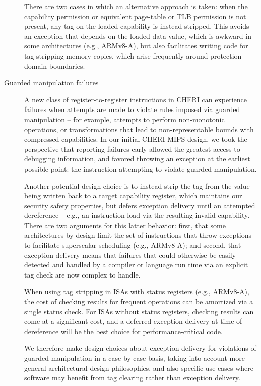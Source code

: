 \begin{description}
  There are two cases in which an alternative approach is taken: when the
  \cappermL capability permission or equivalent page-table or TLB
  permission is not present, any tag on the loaded capability is instead
  stripped.
  This avoids an exception that depends on the loaded data value, which is
  awkward in some architectures (e.g., ARMv8-A), but also facilitates writing
  code for tag-stripping memory copies, which arise frequently around
  protection-domain boundaries.

\item[Guarded manipulation failures]
  A new class of register-to-register instructions in CHERI can experience
  failures when attempts are made to violate rules imposed via guarded
  manipulation -- for example, attempts to perform non-monotonic operations, or
  transformations that lead to non-representable bounds with compressed
  capabilities.
  In our initial CHERI-MIPS design, we took the perspective that reporting
  failures early allowed the greatest access to debugging information, and
  favored throwing an exception at the earliest possible point: the
  instruction attempting to violate guarded manipulation.

  Another potential design choice is to instead strip the tag from the value
  being written back to a target capability register, which maintains our
  security safety properties, but defers exception delivery until an attempted
  dereference -- e.g., an instruction load via the resulting invalid
  capability.
  There are two arguments for this latter behavior: first, that some
  architectures by design limit the set of instructions that throw exceptions
  to facilitate superscalar scheduling (e.g., ARMv8-A); and second, that
  exception delivery means that failures that could otherwise be easily
  detected and handled by a compiler or language run time via an explicit tag
  check are now complex to handle.

  When using tag stripping in ISAs with status registers (e.g., ARMv8-A), the
  cost of checking results for frequent operations can be amortized via a
  single status check.
  For ISAs without status registers, checking results can come at a
  significant cost, and a deferred exception delivery at time of dereference
  will be the best choice for performance-critical code.

  We therefore make design choices about exception delivery for violations of
  guarded manipulation in a case-by-case basis, taking into account more
  general architectural design philosophies, and also specific use cases where
  software may benefit from tag clearing rather than exception delivery.
\end{description}

